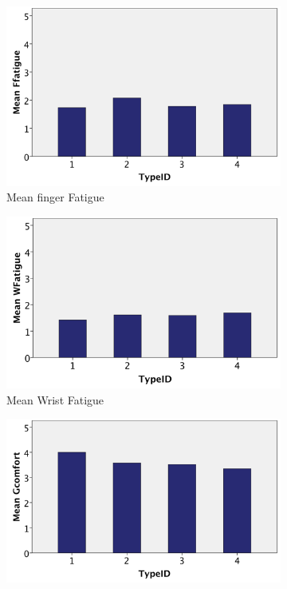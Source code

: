 \begin{figure}[H]
\begin{subfigure}[b]{0.4\textwidth}
        \includegraphics[width=\textwidth]{figures/meanFFatigue}
        \caption{Mean finger Fatigue}
        \label{fig:meanFFatigue}
    \end{subfigure}
    \hfill
    \begin{subfigure}[b]{0.4\textwidth}
        \centering
        \includegraphics[width=\textwidth]{figures/meanWFatigue}
        \caption{Mean Wrist Fatigue}
        \label{fig:meanWFatigue}
    \end{subfigure}
    \hfill
    \begin{subfigure}[b]{0.4\textwidth}
        \centering
        \includegraphics[width=\textwidth]{figures/meanGComfort}

\end{subfigure}
\end{figure}
